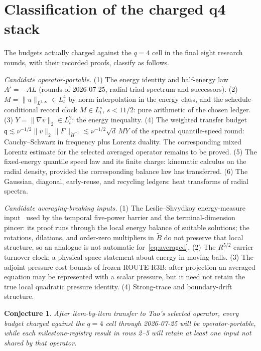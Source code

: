 \documentclass[11pt]{article}
\newtheorem{conjecture}[theorem]{Conjecture}
\theoremstyle{remark}
\newcommand{\wL}{L^{3,\infty}}
\begin{document}
\section{Classification of the charged q4 stack}

The budgets actually charged against the \(q=4\) cell in the final
eight research rounds, with their recorded proofs, classify as follows.

\emph{Candidate operator-portable.}
(1) The energy identity and half-energy law \(A'=-AL\)
(rounds of 2026-07-25, radial triad spectrum and successors).
(2) \(M=\|u\|_{\wL}\in L^4_t\) by norm interpolation in the energy
class, and the schedule-conditional record clock \(M\in L^s_t\),
\(s<11/2\): pure arithmetic of the chosen ledger.
(3) \(Y=\|\nabla v\|_2\in L^2_t\): the energy inequality.
(4) The weighted transfer budget
\(\mathfrak q\lesssim\nu^{-1/2}\|v\|_2\|F\|_{\dot H^{-1}}\lesssim
\nu^{-1/2}\sqrt d\,MY\)
of the spectral quantile-speed round: Cauchy--Schwarz in frequency plus
Lorentz duality.  The corresponding mixed Lorentz estimate for the
selected averaged operator remains to be proved.
(5) The fixed-energy quantile speed law and its finite charge: kinematic
calculus on the radial density, provided the corresponding balance law
has transferred.
(6) The Gaussian, diagonal, early-reuse, and recycling ledgers: heat
transforms of radial spectra.

\emph{Candidate averaging-breaking inputs.}
(1) The Leslie--Shvydkoy energy-measure input~\cite{LS18} used by the
temporal five-power barrier and the terminal-dimension pincer: its
proof runs through the local energy balance of suitable solutions;
the rotations, dilations, and order-zero multipliers in \(\tilde B\)
do not preserve that local structure, so an analogue is not automatic
for~\eqref{eq:averaged}.
(2) The \(R^{5/2}\) carrier turnover clock: a physical-space statement
about energy in moving balls.
(3) The adjoint-pressure cost bounds of frozen ROUTE-R3B: after
projection an averaged equation may be represented with a scalar
pressure, but it need not retain the true local quadratic pressure
identity.
(4) Strong-trace and boundary-drift structure.

\begin{conjecture}
\label{prop:split}
After item-by-item transfer to Tao's selected operator, every budget
charged against the \(q=4\) cell through 2026-07-25 will be
operator-portable, while each milestone-registry result in rows 2--5
will retain at least one input not shared by that operator.
\end{conjecture}
\end{document}
